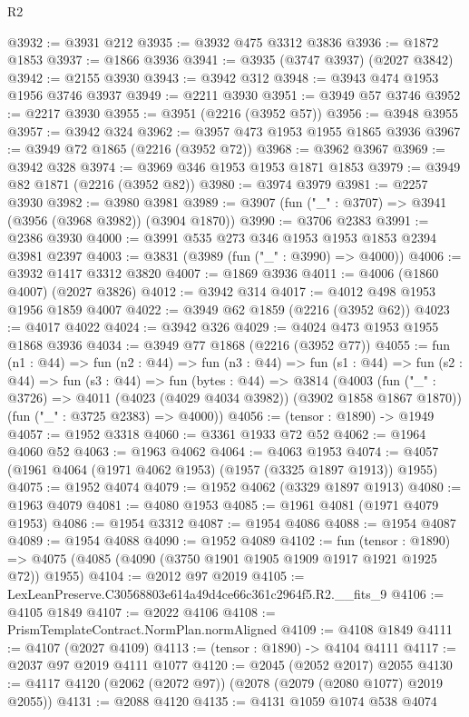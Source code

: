 \begin{lexlean}{R2}
\begin{coremodule}
@3932 := @3931 @212
@3935 := @3932 @475 @3312 @3836
@3936 := @1872 @1853
@3937 := @1866 @3936
@3941 := @3935 (@3747 @3937) (@2027 @3842)
@3942 := @2155 @3930
@3943 := @3942 @312
@3948 := @3943 @474 @1953 @1956 @3746 @3937
@3949 := @2211 @3930
@3951 := @3949 @57 @3746
@3952 := @2217 @3930
@3955 := @3951 (@2216 (@3952 @57))
@3956 := @3948 @3955
@3957 := @3942 @324
@3962 := @3957 @473 @1953 @1955 @1865 @3936
@3967 := @3949 @72 @1865 (@2216 (@3952 @72))
@3968 := @3962 @3967
@3969 := @3942 @328
@3974 := @3969 @346 @1953 @1953 @1871 @1853
@3979 := @3949 @82 @1871 (@2216 (@3952 @82))
@3980 := @3974 @3979
@3981 := @2257 @3930
@3982 := @3980 @3981
@3989 := @3907 (fun ("_" : @3707) => @3941 (@3956 (@3968 @3982)) (@3904 @1870))
@3990 := @3706 @2383
@3991 := @2386 @3930
@4000 := @3991 @535 @273 @346 @1953 @1953 @1853 @2394 @3981 @2397
@4003 := @3831 (@3989 (fun ("_" : @3990) => @4000))
@4006 := @3932 @1417 @3312 @3820
@4007 := @1869 @3936
@4011 := @4006 (@1860 @4007) (@2027 @3826)
@4012 := @3942 @314
@4017 := @4012 @498 @1953 @1956 @1859 @4007
@4022 := @3949 @62 @1859 (@2216 (@3952 @62))
@4023 := @4017 @4022
@4024 := @3942 @326
@4029 := @4024 @473 @1953 @1955 @1868 @3936
@4034 := @3949 @77 @1868 (@2216 (@3952 @77))
@4055 := fun (n1 : @44) =>
  fun (n2 : @44) =>
  fun (n3 : @44) =>
  fun (s1 : @44) =>
  fun (s2 : @44) =>
  fun (s3 : @44) =>
  fun (bytes : @44) =>
  @3814
    (@4003
      (fun ("_" : @3726) => @4011 (@4023 (@4029 @4034 @3982)) (@3902 @1858 @1867 @1870))
      (fun ("_" : @3725 @2383) => @4000))
@4056 := (tensor : @1890) -> @1949
@4057 := @1952 @3318
@4060 := @3361 @1933 @72 @52
@4062 := @1964 @4060 @52
@4063 := @1963 @4062
@4064 := @4063 @1953
@4074 := @4057 (@1961 @4064 (@1971 @4062 @1953) (@1957 (@3325 @1897 @1913)) @1955)
@4075 := @1952 @4074
@4079 := @1952 @4062 (@3329 @1897 @1913)
@4080 := @1963 @4079
@4081 := @4080 @1953
@4085 := @1961 @4081 (@1971 @4079 @1953)
@4086 := @1954 @3312
@4087 := @1954 @4086
@4088 := @1954 @4087
@4089 := @1954 @4088
@4090 := @1952 @4089
@4102 := fun (tensor : @1890) =>
  @4075 (@4085 (@4090 (@3750 @1901 @1905 @1909 @1917 @1921 @1925 @72)) @1955)
@4104 := @2012 @97 @2019
@4105 := LexLeanPreserve.C30568803e614a49d4ce66c361c2964f5.R2.__fits_9
@4106 := @4105 @1849
@4107 := @2022 @4106
@4108 := PrismTemplateContract.NormPlan.normAligned
@4109 := @4108 @1849
@4111 := @4107 (@2027 @4109)
@4113 := (tensor : @1890) -> @4104 @4111
@4117 := @2037 @97 @2019 @4111 @1077
@4120 := @2045 (@2052 @2017) @2055
@4130 := @4117 @4120 (@2062 (@2072 @97)) (@2078 (@2079 (@2080 @1077) @2019 @2055))
@4131 := @2088 @4120
@4135 := @4131 @1059 @1074 @538 @4074

\end{coremodule}
\end{lexlean}
